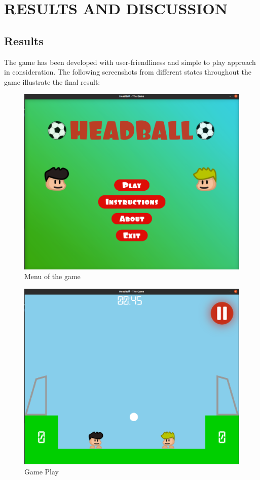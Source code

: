 \documentclass[main]{subfiles}
\begin{document}
\chapter{RESULTS AND DISCUSSION}
\section{Results}
The game has been developed with user-friendliness and simple to play approach in consideration. The following screenshots from different states throughout the game illustrate the final result:
\begin{figure}[H]
    \centering
    \includegraphics[scale=0.25]{graphics/state_screenshots/menu_state.png}
    \caption{Menu of the game}
    \label{fig:menu_state}
\end{figure}

\begin{figure}[H]
    \centering
    \includegraphics[scale=0.25]{graphics/state_screenshots/game_state1}
    \caption{Game Play}
    \label{fig:game_state}
\end{figure}
\end{document}
